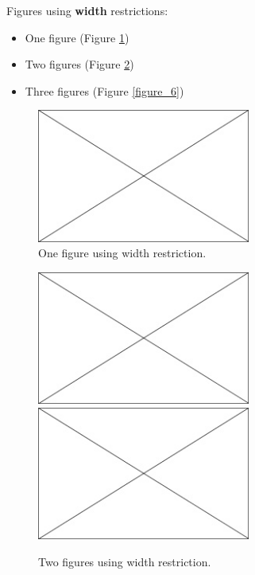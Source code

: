 Figures using \textbf{width} restrictions:
\begin{itemize}
	\item One figure (Figure \ref{figure_4})
	\item Two figures (Figure \ref{figure_5})
	\item Three figures (Figure \ref{figure_6})
\end{itemize}

\begin{figure}[H] %
	\begin{center}
		\includegraphics[width=7cm]{Figures/Chapter_1/placeholder} \caption{
			\label{figure_4} One figure using width restriction.}
		\vspace{-0.5cm}
	\end{center}
\end{figure}

\begin{figure}[H] %
	\begin{center}
		\includegraphics[width=7cm]{Figures/Chapter_1/placeholder} \includegraphics[width=7cm]{Figures/Chapter_1/placeholder} \caption{
			\label{figure_5} Two figures using width restriction.}
		\vspace{-0.5cm}
	\end{center}
\end{figure}

